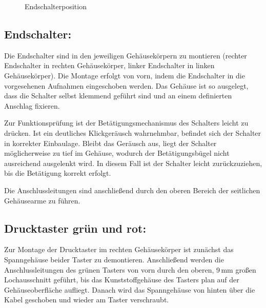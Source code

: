 \begin{figure}[H]

\caption{Endschalterposition}
\label{tikz:Endschalter}
\end{figure}

\subsection{Endschalter:}
Die Endschalter sind in den jeweiligen Gehäusekörpern zu montieren (rechter Endschalter in rechten Gehäusekörper, linker Endschalter in linken Gehäusekörper). Die Montage erfolgt von vorn, indem die Endschalter in die vorgesehenen Aufnahmen eingeschoben werden. Das Gehäuse ist so ausgelegt, dass die Schalter selbst klemmend geführt sind und an einem definierten Anschlag fixieren.

Zur Funktionsprüfung ist der Betätigungsmechanismus des Schalters leicht zu drücken. Ist ein deutliches Klickgeräusch wahrnehmbar, befindet sich der Schalter in korrekter Einbaulage. Bleibt das Geräusch aus, liegt der Schalter möglicherweise zu tief im Gehäuse, wodurch der Betätigungsbügel nicht ausreichend ausgelenkt wird. In diesem Fall ist der Schalter leicht zurückzuziehen, bis die Betätigung korrekt erfolgt.

Die Anschlussleitungen sind anschließend durch den oberen Bereich der seitlichen Gehäusearme zu führen.


\subsection{Drucktaster grün und rot:}
Zur Montage der Drucktaster im rechten Gehäusekörper ist zunächst das Spanngehäuse beider Taster zu demontieren. Anschließend werden die Anschlussleitungen des grünen Tasters von vorn durch den oberen, 9 mm großen Lochausschnitt geführt, bis das Kunststoffgehäuse des Tasters plan auf der Gehäuseoberfläche aufliegt. Danach wird das Spanngehäuse von hinten über die Kabel geschoben und wieder am Taster verschraubt.

